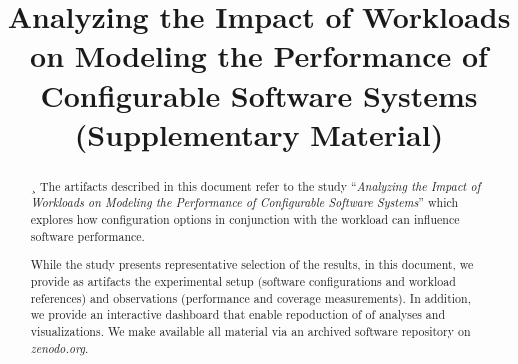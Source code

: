 \documentclass[10pt,conference]{IEEEtran}
\begin{document}
	
	\title{Analyzing the Impact of Workloads on Modeling the Performance of Configurable Software Systems (Supplementary Material)}
	
	\author{
		\centering
		\and
		\and
		\and
		\and
		\linebreakand
		\and
	}
	
	
	\maketitle
	
	
	\maketitle
	\setcounter{tocdepth}{4}
	
	\begin{abstract}¸
	The artifacts described in this document refer to the study ``\textit{Analyzing the Impact of Workloads on Modeling the Performance of Configurable Software Systems}'' which explores how configuration options in conjunction with the workload can influence software performance.
	
	While the study presents representative selection of the results, in this document, we provide as artifacts the experimental setup (software configurations and workload references) and observations (performance and coverage measurements). In addition, we provide an interactive dashboard that enable repoduction of of analyses and visualizations. We make available all material via an archived software repository on \textit{zenodo.org}.
	\end{abstract}
\end{document}

